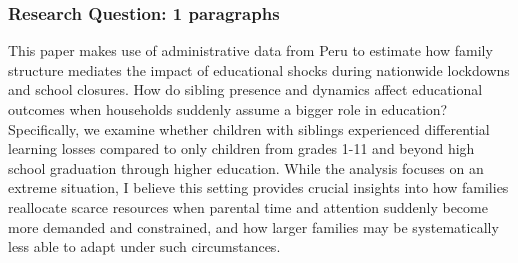 
\subsubsection{Research Question: 1 paragraphs}

This paper makes use of administrative data from Peru to estimate how family structure mediates the impact of educational shocks during nationwide lockdowns and school closures. How do sibling presence and dynamics affect educational outcomes when households suddenly assume a bigger role in education? Specifically, we examine whether children with siblings experienced differential learning losses compared to only children from grades 1-11 and beyond high school graduation through higher education. While the analysis focuses on an extreme situation, I believe this setting provides crucial insights into how families reallocate scarce resources when parental time and attention suddenly become more demanded and constrained, and how larger families may be systematically less able to adapt under such circumstances.


